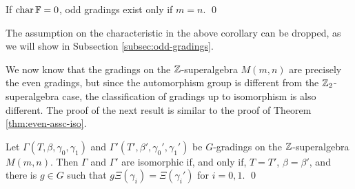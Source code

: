 \begin{cor}\label{cor:m=n}
	If $\operatorname{char} \mathbb{F} = 0$, odd gradings exist only if $m=n$. \qed
\end{cor}

The assumption on the characteristic in the above corollary can be dropped, as we will show in Subsection \ref{subsec:odd-gradings}.%

We now know that the gradings on the $\mathbb{Z}$-superalgebra $M(m,n)$ are precisely the even gradings, but since the automorphism group is different
from the $\mathbb{Z}_2$-superalgebra case, the classification of gradings up to isomorphism is also different.
The proof of the next result is similar to the proof of Theorem \ref{thm:even-assc-iso}.

\begin{thm}
	Let $\Gamma(T,\beta,\gamma_0,\gamma_1)$ and $\Gamma'(T',\beta',\gamma_0',\gamma_1')$ be $G$-gradings on the $\mathbb{Z}$-su\-per\-al\-ge\-bra $M(m,n)$.
	Then $\Gamma$ and $\Gamma'$ are isomorphic if, and only if, $T=T'$, $\beta=\beta'$, and there is $g\in G$ such that $g\Xi (\gamma_i) = \Xi (\gamma_i')$ for $i=0,1$. \qed
\end{thm}


